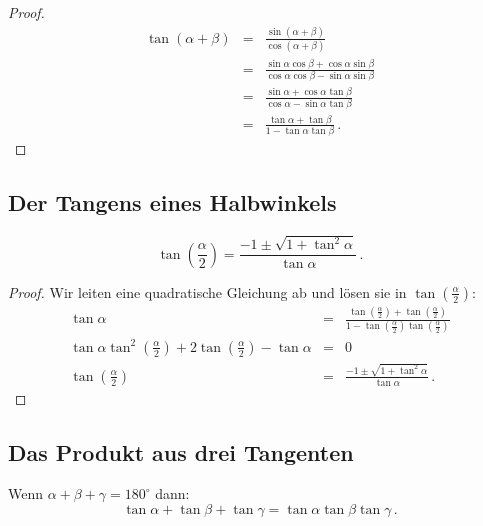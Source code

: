 \begin{proof}
\begin{eqnarray*}
\tan (\alpha+\beta) &=& \frac{\sin(\alpha+\beta)}{\cos(\alpha+\beta)}\\
&=&\frac{\sin\alpha\cos\beta+\cos\alpha\sin\beta}{\cos\alpha\cos\beta-\sin\alpha\sin\beta}\\
&=&\frac{\sin\alpha+\cos\alpha\tan\beta}{\cos\alpha-\sin\alpha\tan\beta}\\
&=&\frac{\tan\alpha+\tan\beta}{1-\tan\alpha\tan\beta}\,.
\end{eqnarray*}
\end{proof}


\subsection{Der Tangens eines Halbwinkels}\label{s.tangent-half}
\begin{theorem}\label{thm.tangent-half}
\[
\tan\left(\frac{\alpha}{2}\right) = \frac{-1\pm\sqrt{1+\tan^2\alpha}}{\tan\alpha}\,.
\]
\end{theorem}
\begin{proof}
Wir leiten eine quadratische Gleichung ab und lösen sie in $\displaystyle\tan\left(\displaystyle\frac{\alpha}{2}\right)$:
\begin{displaymath}
\begin{array}{lll}
\tan \alpha&=&\displaystyle\frac{
  \tan\left(\displaystyle\frac{\alpha}{2}\right)+
  \tan\left(\displaystyle\frac{\alpha}{2}\right)
  }{
  1-\tan\left(\displaystyle\frac{\alpha}{2}\right)
    \tan\left(\displaystyle\frac{\alpha}{2}\right)
  }\\
\tan\alpha \tan^2  \left(\displaystyle\frac{\alpha}{2}\right) + 2 \tan \left(\displaystyle\frac{\alpha}{2}\right) -\tan\alpha &=&0\\
\tan\left(\displaystyle\frac{\alpha}{2}\right) &=& \displaystyle\frac{-1\pm\sqrt{1+\tan^2\alpha}}{\tan\alpha}\,.
\end{array}
\end{displaymath}
\end{proof}


\subsection{Das Produkt aus drei Tangenten}\label{s.tangent-three}
\begin{theorem}\label{thm.tangent3}
Wenn $\alpha+\beta+\gamma=180^\circ$ dann:
\[
\tan\alpha+\tan\beta+\tan\gamma = \tan\alpha\tan\beta\tan\gamma\,.
\]
\end{theorem}

